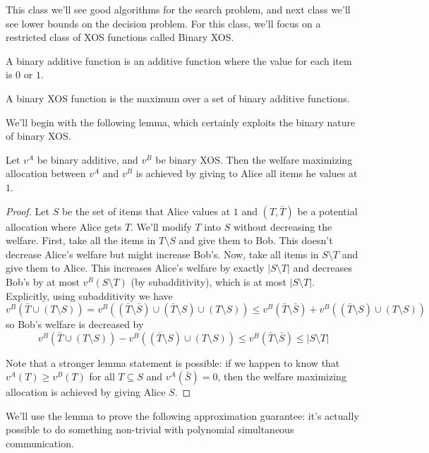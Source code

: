 This class we'll see good algorithms for the search problem, and next class we'll see lower bounds on the decision problem. For this class, we'll focus on a restricted class of XOS functions called Binary XOS. 

\begin{definition} A binary additive function is an additive function where the value for each item is $0$ or $1$.
\end{definition}

\begin{definition} A binary XOS function is the maximum over a set of binary additive functions.
\end{definition}

We'll begin with the following lemma, which certainly exploits the binary nature of binary XOS.

\begin{lemma}Let $v^A$ be binary additive, and $v^B$ be binary XOS. Then the welfare maximizing allocation between $v^A$ and $v^B$ is achieved by giving to Alice all items he values at $1$.
\end{lemma}
\begin{proof}
Let $S$ be the set of items that Alice values at $1$ and $(T,\bar{T})$ be a potential allocation where Alice gets $T$. We'll modify $T$ into $S$ without decreasing the welfare. First, take all the items in $T\setminus S$ and give them to Bob. This doesn't decrease Alice's welfare but might increase Bob's. Now, take all items in $S \setminus T$ and give them to Alice. This increases Alice's welfare by exactly $|S \setminus T|$ and decreases Bob's by at most $v^B(S \setminus T)$ (by subadditivity), which is at most $|S \setminus T|$. Explicitly, using subadditivity we have
$$v^B(\bar{T} \cup (T \setminus S)) = v^B((\bar{T} \setminus \bar{S}) \cup (\bar{T} \setminus S) \cup (T \setminus S)) \leq v^B(\bar{T} \setminus \bar{S}) + v^B((\bar{T} \setminus S) \cup (T \setminus S))$$
so Bob's welfare is decreased by
$$v^B(\bar{T} \cup (T \setminus S)) - v^B((\bar{T} \setminus S) \cup (T \setminus S)) \leq v^B(\bar{T} \setminus \bar{S}) \leq |S \setminus T|$$

Note that a stronger lemma statement is possible: if we happen to know that $v^A(T) \geq v^B(T)$ for all $T \subseteq S$ and $v^A(\bar{S}) = 0$, then the welfare maximizing allocation is achieved by giving Alice $S$. 
\end{proof}

We'll use the lemma to prove the following approximation guarantee: it's actually possible to do something non-trivial with polynomial simultaneous communication. 


